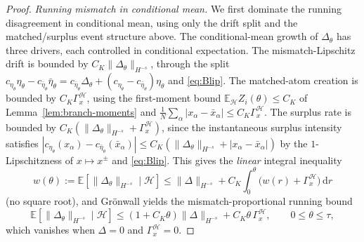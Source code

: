 \documentclass[a4paper,fleqn]{cas-sc}
\theoremstyle{definition}
\theoremstyle{remark}
\begin{document}
\begin{proof}
\emph{Running mismatch in conditional mean.} We first dominate the running
disagreement in conditional mean, using only the drift split and the matched/surplus
event structure above. The conditional-mean growth of $\Delta_\theta$ has three drivers, each controlled in conditional
expectation. The mismatch-Lipschitz drift is bounded by $C_K\|\Delta_\theta\|_{H^{-s}}$, through the
split $c_{\eta_\theta}\eta_\theta-c_{\bar\eta_\theta}\bar\eta_\theta
=c_{\bar\eta_\theta}\Delta_\theta+(c_{\eta_\theta}-c_{\bar\eta_\theta})\eta_\theta$ and \eqref{eq:Blip}.
The matched-atom creation is bounded by $C_K\Gamma_x^{\mathcal H}$, using the first-moment bound
$\mathbb E_{\mathcal H}Z_i(\theta)\le C_K$ of Lemma~\ref{lem:branch-moments} and
$\frac1N\sum_\alpha|x_\alpha-\bar x_\alpha|\le C_K\Gamma_x^{\mathcal H}$. The surplus rate is bounded by
$C_K(\|\Delta_\theta\|_{H^{-s}}+\Gamma_x^{\mathcal H})$, since the instantaneous surplus intensity satisfies
$|c_{\eta_\theta}(x_\alpha)-c_{\bar\eta_\theta}(\bar x_\alpha)|\le C_K(\|\Delta_\theta\|_{H^{-s}}+|x_\alpha-\bar x_\alpha|)$
by the $1$-Lipschitzness of $x\mapsto x^\pm$ and \eqref{eq:Blip}.
This gives the \emph{linear} integral inequality
\[
w(\theta):=\mathbb E[\|\Delta_\theta\|_{H^{-s}}\mid\mathcal H]
\le\|\Delta\|_{H^{-s}}+C_K\!\int_0^\theta\bigl(w(r)+\Gamma_x^{\mathcal H}\bigr)\,\mathrm dr
\]
(no square root), and Gr\"onwall yields the mismatch-proportional running bound
\begin{equation}\label{eq:run-mismatch}
\mathbb E[\|\Delta_\theta\|_{H^{-s}}\mid\mathcal H]\le(1+C_K\theta)\|\Delta\|_{H^{-s}}+C_K\theta\,\Gamma_x^{\mathcal H},
\qquad 0\le\theta\le\tau,
\end{equation}
which vanishes when $\Delta=0$ and $\Gamma_x^{\mathcal H}=0$.


\end{proof}
\end{document}
